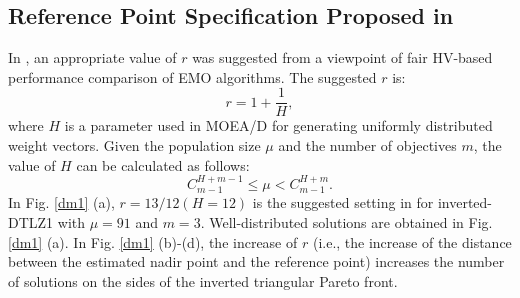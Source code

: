 \documentclass[conference]{IEEEtran}
\begin{document}
\subsection{Reference Point Specification Proposed in \cite{hisao:RPhowtoSpecify}}
In \cite{hisao:RPexplanation, hisao:RPhowtoSpecify, hisao:RPspecify}, 
an appropriate value of $r$ was suggested from a viewpoint of fair HV-based performance comparison of EMO algorithms. 
The suggested $r$ is: 
\begin{equation}\label{eod}
  r=1+\frac{1}{H},
\end{equation}
where $H$ is a parameter used in MOEA/D\cite{MOEAD} for 
generating uniformly distributed weight vectors\cite{hisao:dynamic}. 
Given the population size $\mu$ and the number of objectives $m$, the value of $H$ can be calculated as follows:
\begin{equation}
  C^{H+m-1}_{m-1} \leq \mu < C^{H+m}_{m-1}.
\end{equation}
In Fig. \ref{dm1} (a), $r=13/12 (H=12)$ is the suggested setting in \cite{hisao:RPhowtoSpecify} for inverted-DTLZ1 with $\mu = 91$ and $m = 3$.
Well-distributed solutions are obtained in Fig. \ref{dm1} (a). 
In Fig. \ref{dm1} (b)-(d), the increase of $r$ 
(i.e., the increase of the distance between the estimated nadir point and the reference point) 
increases the number of solutions on the sides of the inverted triangular Pareto front.
\end{document}
